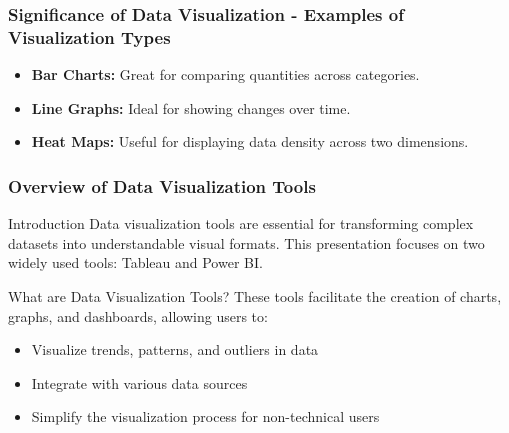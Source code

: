 \documentclass[aspectratio=169]{beamer}
\begin{document}
\begin{frame}[fragile]
    \frametitle{Significance of Data Visualization - Examples of Visualization Types}
    \begin{itemize}
        \item \textbf{Bar Charts:} Great for comparing quantities across categories.
        \item \textbf{Line Graphs:} Ideal for showing changes over time.
        \item \textbf{Heat Maps:} Useful for displaying data density across two dimensions.
    \end{itemize}
\end{frame}

\begin{frame}[fragile]
    \frametitle{Overview of Data Visualization Tools}
    \begin{block}{Introduction}
        Data visualization tools are essential for transforming complex datasets into understandable visual formats. This presentation focuses on two widely used tools: Tableau and Power BI.
    \end{block}
    
    \begin{block}{What are Data Visualization Tools?}
        These tools facilitate the creation of charts, graphs, and dashboards, allowing users to:
        \begin{itemize}
            \item Visualize trends, patterns, and outliers in data
            \item Integrate with various data sources
            \item Simplify the visualization process for non-technical users
        \end{itemize}
    \end{block}
\end{frame}
\end{document}
